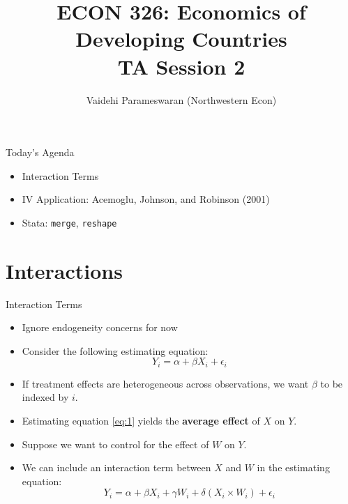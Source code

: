 \documentclass[11pt,notes=hide,aspectratio=169,mathserif]{beamer}
\title[class]{ECON 326: Economics of Developing Countries \\ TA Session 2}
\author[vaidehi's class ]{Vaidehi Parameswaran (Northwestern Econ)}
\date{\monthname[\the\month] \the\year}
\begin{document}
\begin{frame}[plain]
\titlepage
\end{frame}


\begin{frame}{Today's Agenda}
\begin{itemize}
\item Interaction Terms
\item IV Application: Acemoglu, Johnson, and Robinson (2001)
\item Stata: \texttt{merge}, \texttt{reshape}
\end{itemize}
\end{frame}


\section*{Interactions}

\begin{frame}{Interaction Terms}
\begin{itemize}
\item Ignore endogeneity concerns for now 
\item Consider the following estimating equation:
\begin{equation}
\label{eq:1}
    Y_i = \alpha + \beta X_i + \epsilon_i
\end{equation}
\item If treatment effects are heterogeneous across observations, we want $\beta$ to be indexed by $i$. 
\item Estimating equation \eqref{eq:1} yields the \textbf{average effect} of $X$ on $Y$.
\item Suppose we want to control for the effect of $W$ on $Y$.
\item We can include an interaction term between $X$ and $W$ in the estimating equation:
\begin{equation}
\label{eq:2}
    Y_i = \alpha + \beta X_i + \gamma W_i + \delta (X_i \times W_i) + \epsilon_i
\end{equation}
\end{itemize}
\end{frame}
\end{document}
